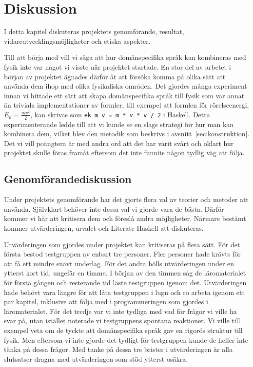 
\chapter{Diskussion}

I detta kapitel diskuteras projektets genomförande, resultat,
vidareutvecklingsmöjligheter och etiska aspekter.

Till att börja med vill vi säga att hur domänspecifika språk kan kombineras med
fysik inte var något vi visste när projektet startade. En stor del av arbetet i
början av projektet ägnades därför åt att försöka komma på olika sätt att
använda dem ihop med olika fysikaliska områden. Det gjordes många experiment
innan vi hittade ett sätt att skapa domänspecifika språk till fysik som var annat än
triviala implementationer av formler, till exempel att formlen för
rörelseenergi, $E_k = \frac{mv^2}{2}$, kan skrivas som \texttt{ek m v = m * v *
v / 2} i Haskell. Detta experimenterande ledde till att
vi kunde se en slags strategi för hur man kan kombinera dem, vilket blev den
metodik som beskrivs i avsnitt~\ref{sec:konstruktion}. Det vi vill poängtera är
med andra ord att det har varit svårt och oklart hur projektet skulle föras
framåt eftersom det inte funnits någon tydlig väg att följa.

\section{Genomförandediskussion}

Under projektets genomförande har det gjorts flera val av teorier och metoder
att använda. Självklart behöver inte dessa val vi gjorde vara de bästa.
Därför kommer vi här att kritisera dem och föreslå andra möjligheter. Närmare
bestämt kommer utvärderingen, urvalet och Literate Haskell att diskuteras.

Utvärderingen som gjordes under projektet kan kritiseras på flera sätt. För det
första bestod testgruppen av enbart tre personer. Fler
personer hade krävts för att få ett mindre snävt underlag. För det andra hölls
utvärderingen under en ytterst kort tid, ungefär en timme. I början av den
timmen såg de läromaterialet för första gången och resterande tid läste
testgruppen igenom det. Utvärderingen hade behövt vara längre för att låta testgruppen
i lugn och ro arbeta igenom ett par kapitel, inklusive att följa med i
programmeringen som gjordes i läromaterialet. För det tredje var vi inte tydliga
med vad för frågor vi ville ha svar på, utan istället noterade vi testgruppens
spontana reaktioner. Vi ville till exempel veta om de tyckte att domänspecifika
språk gav en rigorös struktur till fysik. Men eftersom vi inte gjorde det
tydligt för testgruppen kunde de heller inte tänka på dessa frågor. Med tanke på
dessa tre brister i utvärderingen är alla slutsatser dragna med utvärderingen
som stöd ytterst osäkra.

